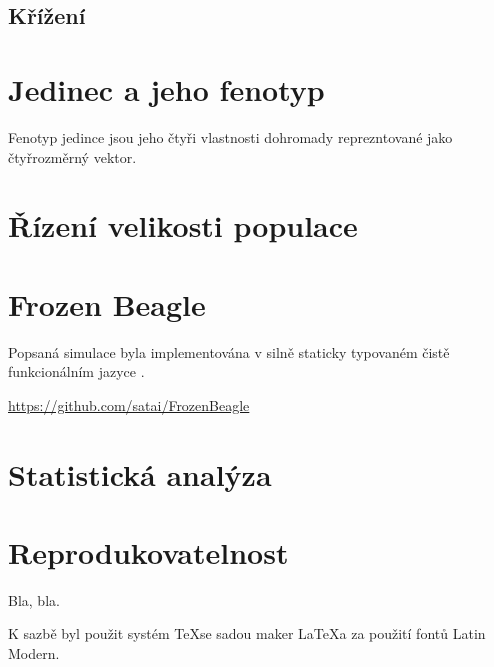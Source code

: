 \subsection{Křížení}



\section{Jedinec a jeho fenotyp}

Fenotyp jedince jsou jeho čtyři vlastnosti dohromady reprezntované jako čtyřrozměrný vektor.


\section{Řízení velikosti populace}


\section{Frozen Beagle}

Popsaná simulace byla implementována v silně staticky typovaném čistě funkcionálním jazyce \cite{haskell}.

\url {https://github.com/satai/FrozenBeagle}

\section{Statistická analýza}
\section{Reprodukovatelnost}

Bla, bla.

K sazbě byl použit systém \TeX se sadou maker \LaTeX a za použití fontů Latin Modern.
